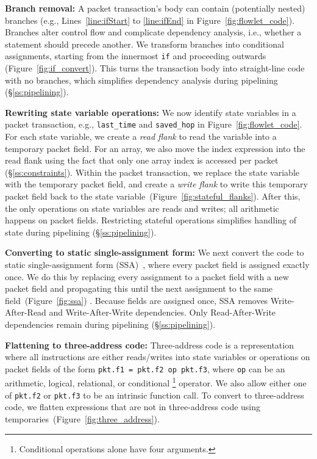 \textbf{Branch removal: }A packet transaction's body can contain (potentially
nested) branches (e.g., Lines~\ref{line:ifStart} to \ref{line:ifEnd} in
Figure~\ref{fig:flowlet_code}).  Branches alter control flow and complicate
dependency analysis, i.e.,  whether a statement should precede another.  We
transform branches into conditional assignments, starting from the innermost
\texttt{if} and proceeding outwards (Figure~\ref{fig:if_convert}).  This turns
the transaction body into straight-line code with no branches, which simplifies
dependency analysis during pipelining (\S\ref{ss:pipelining}).

\textbf{Rewriting state variable operations: }We now identify state variables
in a packet transaction, e.g., \texttt{last\_time} and \texttt{saved\_hop} in
Figure~\ref{fig:flowlet_code}.  For each state variable, we create a
\textit{read flank} to read the variable into a temporary packet field.
For an array, we also move the index expression into the read flank using the
fact that only one array index is accessed per packet (\S\ref{ss:constraints}).
Within the packet transaction, we replace the state variable with the temporary
packet field, and create a \textit{write flank} to write this temporary packet
field back to the state variable~(Figure~\ref{fig:stateful_flanks}). After
this, the only operations on state variables are reads and writes; all
arithmetic happens on packet fields. Restricting stateful operations simplifies
handling of state during pipelining (\S\ref{ss:pipelining}).

\textbf{Converting to static single-assignment form: }We next convert the code
to static single-assignment form (SSA)~\cite{ssa}, where every packet field is
assigned exactly once. We do this by replacing every assignment to a packet
field with a new packet field and propagating this until the next assignment to
the same field~(Figure~\ref{fig:ssa}) .  Because fields are assigned once, SSA
removes Write-After-Read and Write-After-Write dependencies.  Only
Read-After-Write dependencies remain during pipelining (\S\ref{ss:pipelining}).

\textbf{Flattening to three-address code: } Three-address code is a
representation where all instructions are either reads/writes into state
variables or operations on packet fields of the form \texttt{pkt.f1 = pkt.f2 op
pkt.f3}, where \texttt{op} can be an arithmetic, logical, relational, or
conditional \footnote{Conditional operations alone have four arguments.}
operator.  We also allow either one of {\tt pkt.f2} or {\tt pkt.f3} to be an
intrinsic function call.  To convert to three-address code, we flatten
expressions that are not in three-address code using
temporaries~(Figure~\ref{fig:three_address}).

